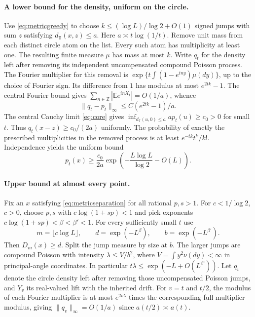 \documentclass[11pt]{article}
\theoremstyle{remark}\newtheorem{remark}[theorem]{Remark}
\begin{document}
\paragraph{A lower bound for the density, uniform on the circle.}
Use \eqref{eq:metricgreedy} to choose $k\le (\log L)/\log2+O(1)$ signed
jumps with sum $z$ satisfying $d_{\mathbb T}(x,z)\le a$.
Here $a\asymp t\log(1/t)$. Remove unit mass from each distinct circle atom
on the list. Every such atom has multiplicity at least one. The resulting
finite measure $\mu$ has mass at most $k$. Write $q_t$ for the density left
after removing its independent uncompensated compound Poisson process.
The Fourier multiplier for this removal is
$\exp\{t\int(1-e^{iny})\mu(dy)\}$, up to the choice of Fourier sign.
Its difference from $1$ has modulus at most $e^{2tk}-1$. The central Fourier
bound gives $\sum_{n\in\mathbb Z}|\mathbb E e^{inX_t}|=O(1/a)$, whence
\[
  \|q_t-p_t\|_\infty\le C(e^{2tk}-1)/a.
\]
The central Cauchy limit \eqref{eq:core} gives
$\inf_{d_{\mathbb T}(u,0)\le a} a p_t(u)\ge c_0>0$ for small $t$.
Thus $q_t(x-z)\ge c_0/(2a)$ uniformly. The probability of exactly the
prescribed multiplicities in the removed process is at least
$e^{-tk}t^k/k!$. Independence yields the uniform bound
\begin{equation}\label{eq:metriclower}
  p_t(x)\ge\frac{c_0}{2a}
      \exp\left(-\frac{L\log L}{\log2}-O(L)\right).
\end{equation}

\paragraph{Upper bound at almost every point.}
Fix an $x$ satisfying \eqref{eq:metricseparation} for all rational
$p,s>1$. For $c<1/\log2$, $c>0$, choose $p,s$ with
$c\log(1+sp)<1$ and pick exponents
$c\log(1+sp)<\beta<\beta'<1$. For every sufficiently small $t$ use
\[
 m=\lfloor c\log L\rfloor,\qquad
 d=\exp(-L^\beta),\qquad b=\exp(-L^{\beta'}).
\]
Then $D_m(x)\ge d$. Split the jump measure by size at $b$.
The larger jumps are compound Poisson with intensity
$\lambda\le V/b^2$, where $V=\int y^2\nu(dy)<\infty$ in principal-angle
coordinates. In particular $t\lambda\le\exp(-L+O(L^{\beta'}))$.
Let $q_v$ denote the circle density left after removing those uncompensated
Poisson jumps, and $Y_v$ its real-valued lift with the inherited drift.
For $v=t$ and $t/2$, the modulus of each Fourier multiplier is at most
$e^{2v\lambda}$ times the corresponding full multiplier modulus, giving $\|q_v\|_\infty=O(1/a)$ since $a(t/2)\asymp a(t)$.
\end{document}
